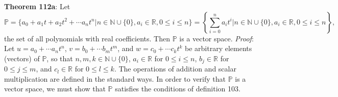 \documentclass{exam}
\begin{document}
\textbf{Theorem 112a}: Let $$\mathbb{P}=\{a_0+a_1 t+a_2 t^2+\cdots a_n t^n|n\in\mathbb{N}\cup\{0\}, a_i\in\mathbb{R}, 0\leq i\leq n\}=\left\{\sum_{i=0}^n a_it^i|n\in\mathbb{N}\cup\{0\},a_i\in\mathbb{R},0\leq i\leq n\right\},$$ the set of all polynomials with real coefficients. Then $\mathbb{P}$ is a vector space.\newline
\vspace{0.2in}
\newline
\textit{Proof}: Let $u=a_0+\cdots a_nt^n$, $v=b_0+\cdots b_mt^m$, and $w=c_0+\cdots c_kt^k$ be arbitrary elements (vectors) of $\mathbb{P}$, so that $n,m,k\in\mathbb{N}\cup\{0\}$, $a_i\in\mathbb{R}$ for $0\leq i\leq n$, $b_j\in\mathbb{R}$ for $0\leq j\leq m$, and $c_l\in\mathbb{R}$ for $0\leq l\leq k$. The operations of addition and scalar multiplication are defined in the standard ways. In order to verify that $\mathbb{P}$ is a vector space, we must show that $\mathbb{P}$ satisfies the conditions of definition 103.
\end{document}
